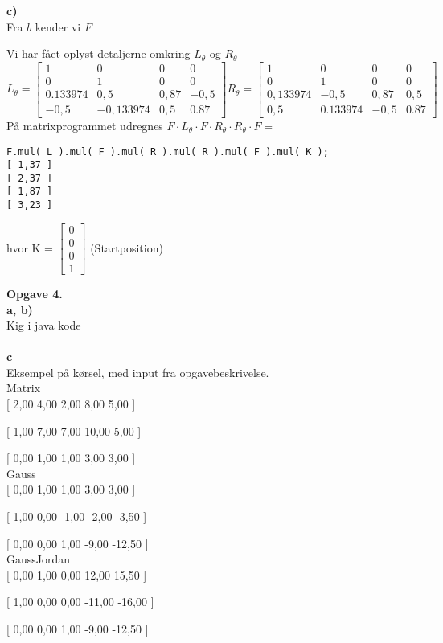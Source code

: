 \documentclass[12pt]{article}
\begin{document}
{\textbf{c)}\\

Fra $b$ kender vi $F$

Vi har fået oplyst detaljerne omkring $L_\theta$ og $R_\theta$\\


$L_\theta = 
	\begin{bmatrix} 
		1 & 0 & 0 & 0\\
		0 & 1 & 0 & 0 \\
		 0.133974 & 0,5 & 0,87 & -0,5\\
		-0,5 & -0,133974 & 0,5 & 0.87   
	\end{bmatrix}
R_\theta = 
	\begin{bmatrix} 
		1 & 0 & 0 & 0\\
		0 & 1 & 0 & 0 \\
		 0,133974 & -0,5 & 0,87 & 0,5\\
		0,5 & 0.133974 & -0,5 & 0.87   
	\end{bmatrix}
$\\

På matrixprogrammet udregnes $  F \cdot L_\theta \cdot F \cdot R_\theta \cdot R_\theta \cdot F  =$
\begin{verbatim}
F.mul( L ).mul( F ).mul( R ).mul( R ).mul( F ).mul( K );
[ 1,37 ]
[ 2,37 ]
[ 1,87 ]
[ 3,23 ]
\end{verbatim}


hvor K = $\begin{bmatrix}0\\0\\0\\1\end{bmatrix}$ (Startposition)


\textbf{\large Opgave 4.}\\

\textbf{a, b)}\\

Kig i java kode\\\\

\textbf{c}\\

Eksempel på kørsel, med input fra opgavebeskrivelse.\\

Matrix\\

[ 2,00 4,00 2,00 8,00 5,00 ]

[ 1,00 7,00 7,00 10,00 5,00 ]

[ 0,00 1,00 1,00 3,00 3,00 ]\\

Gauss\\

[ 0,00 1,00 1,00 3,00 3,00 ]

[ 1,00 0,00 -1,00 -2,00 -3,50 ]

[ 0,00 0,00 1,00 -9,00 -12,50 ]\\

GaussJordan\\

[ 0,00 1,00 0,00 12,00 15,50 ]

[ 1,00 0,00 0,00 -11,00 -16,00 ]

[ 0,00 0,00 1,00 -9,00 -12,50 ]


}
\end{document}
